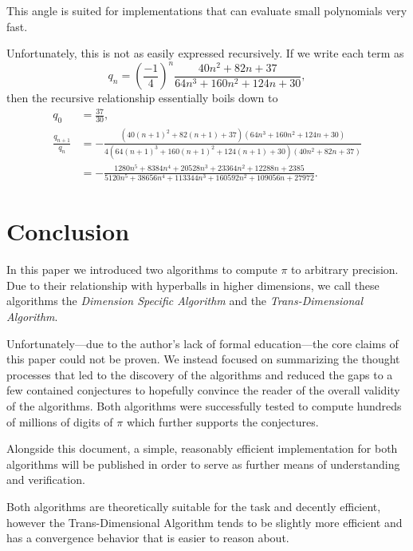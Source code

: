 \documentclass[a4paper,11pt]{scrartcl}
\theoremstyle{definition}
\theoremstyle{plain}
\theoremstyle{remark}
\begin{document}
This angle is suited for implementations that can evaluate small polynomials very fast.

Unfortunately, this is not as easily expressed recursively.
If we write each term as
\[
q_n = \left(\frac{-1}{4}\right)^{n} \frac{40n^2 + 82n + 37}{64n^3 + 160n^2 + 124n + 30},
\]
then the recursive relationship essentially boils down to
\begin{align*}
q_0 &= \frac{37}{30}, \\
\frac{q_{n+1}}{q_n} &= -\frac{(40(n+1)^2 + 82(n+1) + 37)(64n^3 + 160n^2 + 124n + 30)}{4(64(n+1)^3 + 160(n+1)^2 + 124(n+1) + 30)(40n^2 + 82n + 37)} \\
&= -\frac{1280 n^5 + 8384 n^4 + 20528 n^3 + 23364 n^2 + 12288 n + 2385}{5120 n^5 + 38656 n^4 + 113344 n^3 + 160592 n^2 + 109056 n + 27972}.
\end{align*}

\section{Conclusion}

In this paper we introduced two algorithms to compute $\pi$ to arbitrary precision.
Due to their relationship with hyperballs in higher dimensions, we call these algorithms the \emph{Dimension Specific Algorithm} and the \emph{Trans-Dimensional Algorithm}.

Unfortunately---due to the author's lack of formal education---the core claims of this paper could not be proven.
We instead focused on summarizing the thought processes that led to the discovery of the algorithms and reduced the gaps to a few contained conjectures to hopefully convince the reader of the overall validity of the algorithms.
Both algorithms were successfully tested to compute hundreds of millions of digits of $\pi$ which further supports the conjectures.

Alongside this document, a simple, reasonably efficient implementation for both algorithms will be published in order to serve as further means of understanding and verification.

Both algorithms are theoretically suitable for the task and decently efficient, however the Trans-Dimensional Algorithm tends to be slightly more efficient and has a convergence behavior that is easier to reason about.
\end{document}
